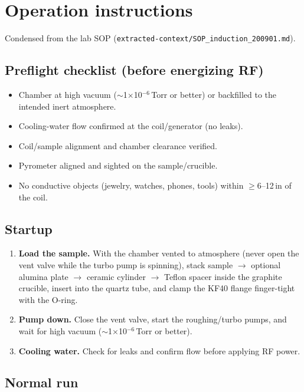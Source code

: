 \documentclass[5p,times]{elsarticle}
\begin{document}
\section{Operation instructions}

Condensed from the lab SOP
(\texttt{extracted-context/SOP\_induction\_200901.md}).

\subsection{Preflight checklist (before energizing RF)}

\begin{itemize}[nosep]
\item[$\square$] Chamber at high vacuum ($\sim$1$\times$10$^{-6}$\,Torr or better) or backfilled to the intended inert atmosphere.
\item[$\square$] Cooling-water flow confirmed at the coil/generator (no leaks).
\item[$\square$] Coil/sample alignment and chamber clearance verified.
\item[$\square$] Pyrometer aligned and sighted on the sample/crucible.
\item[$\square$] No conductive objects (jewelry, watches, phones, tools) within $\ge$6--12\,in of the coil.
\end{itemize}

\subsection{Startup}

\begin{enumerate}[nosep]
\item \textbf{Load the sample.} With the chamber vented to atmosphere (never open the
vent valve while the turbo pump is spinning), stack sample $\rightarrow$ optional
alumina plate $\rightarrow$ ceramic cylinder $\rightarrow$ Teflon spacer inside the
graphite crucible, insert into the quartz tube, and clamp the KF40 flange
finger-tight with the O-ring.
\item \textbf{Pump down.} Close the vent valve, start the roughing/turbo pumps, and
wait for high vacuum ($\sim$1$\times$10$^{-6}$\,Torr or better).
\item \textbf{Cooling water.} Check for leaks and confirm flow before
applying RF power.
\end{enumerate}

\subsection{Normal run}
\end{document}
